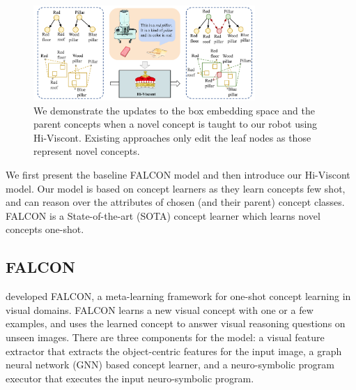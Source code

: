 \begin{figure}
    \centering
    \includegraphics[width=0.75\textwidth]{figures/figure2.pdf}
    \caption{We demonstrate the updates to the box embedding space and the parent concepts when a novel concept is taught to our robot using Hi-Viscont. Existing approaches only edit the leaf nodes as those represent novel concepts.}
    \label{fig:concept_net_model}
\end{figure}

We first present the baseline FALCON model and then introduce our Hi-Viscont model. Our model is based on concept learners as they learn concepts few shot, and can reason over the attributes of chosen (and their parent) concept classes. FALCON is a State-of-the-art (SOTA) concept learner which learns novel concepts one-shot. 


\subsection{FALCON}
\citet{mei2022falcon} developed FALCON, a meta-learning framework for one-shot concept learning in visual domains.
FALCON learns a new visual concept with one or a few examples, and uses the learned concept to answer visual reasoning questions on unseen images.
There are three components for the model: a visual feature extractor that extracts the object-centric features for the input image, a graph neural network (GNN) based concept learner, and a neuro-symbolic program executor that executes the input neuro-symbolic program.


